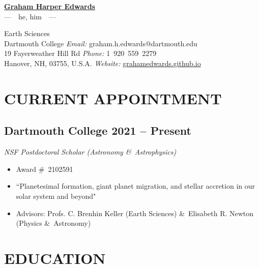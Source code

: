 \documentclass[10pt]{article}
\begin{document}

\begin{center}
\LARGE\textbf{\underline{Graham Harper Edwards}}\\ [.3em]
\large ---~~he, him~~---
\end{center}



Earth Sciences \\
Dartmouth College \hfill \textit{Email:} graham.h.edwards@dartmouth.edu \\
19 Fayerweather Hill Rd \hfill \textit{Phone:} 1~920~559~2279 \\
Hanover, NH, 03755, U.S.A.	\hfill \textit{Website:} \href{https://grahamedwards.github.io}{grahamedwards.github.io}

\vspace{2ex}


\section*{CURRENT APPOINTMENT}
\subsection*{\textbf{Dartmouth College} \hfill 2021 – Present}
\textit{NSF Postdoctoral Scholar (Astronomy \&\ Astrophysics)}
\begin{itemize}
	\item[] Award \#\ 2102591
	\item[] ``Planetesimal formation, giant planet migration, and stellar accretion in our solar system and beyond"
	\item[] Advisors: Profs. C. Brenhin Keller (Earth Sciences) \&\ Elisabeth R. Newton (Physics \&\ Astronomy)
\end{itemize}


\section*{EDUCATION}
\end{document}
